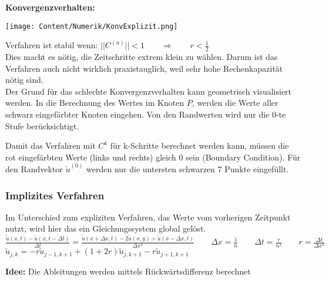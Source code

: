 \textbf{Konvergenzverhalten:} \\

\begin{minipage}{6cm}
  \texttt{[image: Content/Numerik/KonvExplizit.png]}
\end{minipage}
\hfill
\begin{minipage}{12cm}
  Verfahren ist stabil wenn: $||C^{(n)}|| < 1 \qquad \Rightarrow\qquad r < \frac{1}{2}$\\

  Dies macht es nötig, die Zeitschritte extrem klein zu wählen. Darum ist das Verfahren auch nicht wirklich praxistauglich, weil sehr hohe Rechenkapazität nötig sind.\\

  Der Grund für das schlechte Konvergenzverhalten kann geometrisch visualisiert werden. In die Berechnung des Wertes im Knoten $P$, werden die Werte aller schwarz eingefärbter Knoten eingehen. Von den Randwerten wird nur die 0-te Stufe berücksichtigt.
\end{minipage}
Damit das Verfahren mit $C^k$ für k-Schritte berechnet werden kann, müssen die
rot eingefärbten Werte (links und rechts) gleich 0 sein (Boundary Condition).
Für den Randvektor $\tilde{u}^{(0)}$ werden nur die untersten schwarzen 7 Punkte
eingefüllt.

\subsubsection{Implizites Verfahren}
Im Unterschied zum expliziten Verfahren, das Werte vom vorherigen Zeitpunkt nutzt, wird hier das ein Gleichungssystem global gelöst.\\

$\boxed{\frac{\tilde{u}(x,t) - \tilde{u}(x,t -\Delta t)}{\Delta t} =
    \frac{\tilde{u}(x+\Delta x, t)-2\tilde{u}(x,y) + \tilde{u}( x - \Delta x, t )} {\Delta x^2}}
  \qquad \Delta x=\frac{1}{n} \qquad \Delta t=\frac{r}{n^2} \qquad \boxed{r=\frac{\Delta
      t}{\Delta x^2}}$\\

$ \tilde{u}_{j,k} = - r \tilde{u}_{j-1,k+1} + (1+2r)\tilde{u}_{j,k+1} - r \tilde{u}_{j+1,k+1}$

\textbf{Idee:} Die Ableitungen werden mittels Rückwärtsdifferenz berechnet\\


